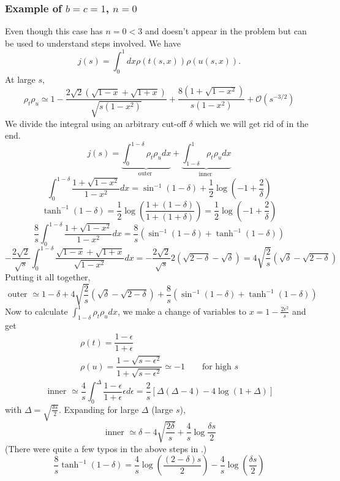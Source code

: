 ﻿\documentclass[12pt,a4paper]{article}
\begin{document}
\subsubsection{Example of $b=c=1$, $n=0$}
Even though this case has $n=0<3$ and doesn't appear in the problem but can be used to understand steps involved. We have
$$
j(s)=\int_{0}^{1} d x \rho(t(s, x)) \rho(u(s, x)) .
$$
At large $s$,
$$
\rho_{t} \rho_{u} \simeq 1-\frac{2 \sqrt{2}(\sqrt{1-x}+\sqrt{1+x})}{\sqrt{s\left(1-x^{2}\right)}}+\frac{8\left(1+\sqrt{1-x^{2}}\right)}{s\left(1-x^{2}\right)}+\mathcal{O}(s^{-3/2})
$$
We divide the integral using an arbitrary cut-off $\delta$ which we will get rid of in the end.
$$
j(s)=\underbrace{\int_{0}^{1-\delta} \rho_{t} \rho_{u} d x}_{\text {outer }}+\underbrace{\int_{1-\delta}^{1} \rho_{t} \rho_{u} d x}_{\text {inner }}
$$
$$
\int_{0}^{1-\delta} \frac{1+\sqrt{1-x^{2}}}{1-x^{2}} d x=\sin^{-1}(1-\delta) + \frac{1}{2} \log \left( -1+\frac{2}{\delta} \right)
$$
$$
\tanh^{-1}(1-\delta)=\frac{1}{2} \log \left( \frac{1+(1-\delta)}{1+(1+\delta)} \right)=\frac{1}{2} \log \left( -1+\frac{2}{\delta} \right)
$$
$$
\frac{8}{s}\int_{0}^{1-\delta} \frac{1+\sqrt{1-x^{2}}}{1-x^{2}} d x=\frac{8}{s}\left(\sin^{-1}(1-\delta) +\tanh^{-1}(1-\delta)\right)
$$
$$
-\frac{2\sqrt{2}}{\sqrt{s}}\int_{0}^{1-\delta} \frac{\sqrt{1-x}+\sqrt{1+x}}{\sqrt{1-x^{2}}} d x=-\frac{2\sqrt{2}}{\sqrt{s}}2\left(\sqrt{2-\delta}-\sqrt{\delta}\right)=4\sqrt{\frac{2}{s}}\left(\sqrt{\delta}-\sqrt{2-\delta}\right)
$$
Putting it all together,
$$
\text { outer } \simeq  1-\delta+4 \sqrt{\frac{2}{s}}(\sqrt{\delta}-\sqrt{2-\delta}) + \frac{8}{s}\left(\sin^{-1}(1-\delta) +\tanh^{-1}(1-\delta)\right)
$$
Now to calculate $\int_{1-\delta}^{1} \rho_{t} \rho_{u} d x$, we make a change of variables to $x=1-\frac{2 \epsilon^{2}}{s}$ and get
$$
\begin{array}{l}
\rho(t)=\dfrac{1-\epsilon}{1+\epsilon}\\
\rho(u)=\dfrac{1-\sqrt{s-\epsilon^{2}}}{1+\sqrt{s-\epsilon^{2}}}\simeq -1 \qquad \text{for high } s
\end{array}
$$
$$
\text { inner } \simeq \frac{4}{s} \int_{0}^{\Delta} \frac{1-\epsilon}{1+\epsilon} \epsilon d \epsilon=\frac{2}{s}[\Delta(\Delta-4)-4 \log (1+\Delta)]
$$
with $\Delta=\sqrt{\frac{\delta s}{2}}$. Expanding for large $\Delta$ (large $s$),
$$
\text { inner } \simeq \delta-4 \sqrt{\frac{2 \delta}{s}}+\frac{4}{s} \log \frac{\delta s}{2}
$$
(There were quite a few typos in the above steps in \cite{7}.)
$$
\frac{8}{s}\tanh^{-1}(1-\delta)=\frac{4}{s} \log \left(\frac{(2-\delta)s}{2} \right)-\frac{4}{s}\log \left(\frac{\delta s}{2} \right)
$$
\end{document}
